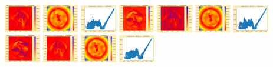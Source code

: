\documentclass[11pt]{article}
\begin{document}
\includegraphics[width=0.11875\textwidth]{frame0062fig3.png}
\includegraphics[width=0.11875\textwidth]{frame0063fig0.png}
\includegraphics[width=0.11875\textwidth]{frame0063fig1.png}
\includegraphics[width=0.11875\textwidth]{frame0063fig2.png}
\includegraphics[width=0.11875\textwidth]{frame0063fig3.png}
\vskip 10pt 
\includegraphics[width=0.11875\textwidth]{frame0064fig0.png}
\includegraphics[width=0.11875\textwidth]{frame0064fig1.png}
\includegraphics[width=0.11875\textwidth]{frame0064fig2.png}
\includegraphics[width=0.11875\textwidth]{frame0064fig3.png}
\includegraphics[width=0.11875\textwidth]{frame0065fig0.png}
\includegraphics[width=0.11875\textwidth]{frame0065fig1.png}
\end{document}
